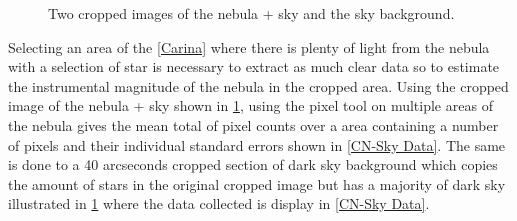 \documentclass[12pt]{article}
\begin{document}
\begin{figure}[H]
\begin{multicols}{2}
\begin{minipage}[H]{0.5\textwidth}
\end{minipage}
\end{multicols}
\caption{Two cropped images of the nebula + sky and the sky background.}
\label{CN}
\end{figure}

Selecting an area of the \cref{Carina} where there is plenty of light from the nebula with a selection of star is necessary to extract as much clear data so to estimate the instrumental magnitude of the nebula in the cropped area. Using the cropped image of the nebula + sky shown in \cref{CN}, using the pixel tool on multiple areas of the nebula gives the mean total of pixel counts over a area containing a number of pixels and their individual standard errors shown in \cref{CN-Sky Data}. The same is done to a 40 arcseconds cropped section of dark sky background which copies the amount of stars in the original cropped image but has a majority of dark sky illustrated in \cref{CN} where the data collected is display in \cref{CN-Sky Data}. \\
\end{document}
